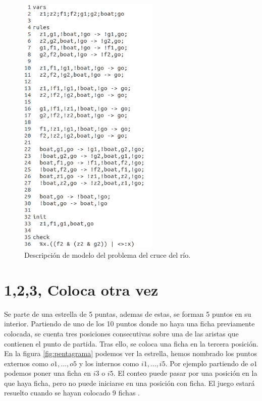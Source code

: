 \begin{figure}[H]
  \centering
  \includegraphics[width=0.6\textwidth]{Figures/rivercross.png}
  \caption{Descripción de modelo del problema del cruce del río.}
  \label{fig:river}
\end{figure}

\section{1,2,3, Coloca otra vez}

Se parte de una estrella de 5 puntas, ademas de estas, se forman 5 puntos en su interior. Partiendo de uno de los 10 puntos donde no haya una ficha previamente colocada, se cuenta tres posiciones consecutivas sobre una de las aristas que contienen el punto de partida. Tras ello, se coloca una ficha en la tercera posición. En la figura \ref{fig:pentagrama} podemos ver la estrella, hemos nombrado los puntos externos como $o1, ..., o5$ y los internos como $i1, ..., i5$. Por ejemplo partiendo de $o1$ podemos poner una ficha en $i3$ o $i5$. El conteo puede pasar por una posición en la que haya ficha, pero no puede iniciarse en una posición con ficha. El juego estará resuelto cuando se hayan colocado 9 fichas \cite{Juegos:11}. 

